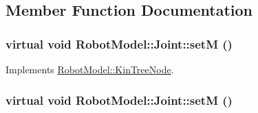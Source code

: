 \subsection{Member Function Documentation}
\hypertarget{class_robot_model_1_1_joint_a485f5fc46f5156a7383bee7edbfc6643}{
\subsubsection[{setM}]{\setlength{\rightskip}{0pt plus 5cm}virtual void RobotModel::Joint::setM ()}}
\label{class_robot_model_1_1_joint_a485f5fc46f5156a7383bee7edbfc6643}


Implements \hyperlink{class_robot_model_1_1_kin_tree_node_a47574c65af53990455540547d8d00e9f}{RobotModel::KinTreeNode}.\hypertarget{class_robot_model_1_1_joint_a485f5fc46f5156a7383bee7edbfc6643}{
\subsubsection[{setM}]{\setlength{\rightskip}{0pt plus 5cm}virtual void RobotModel::Joint::setM ()}}
\label{class_robot_model_1_1_joint_a485f5fc46f5156a7383bee7edbfc6643}


